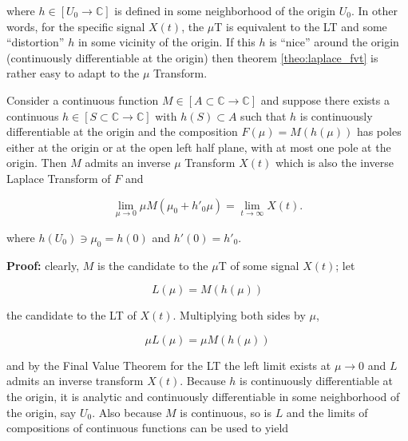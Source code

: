 	\noindent where $h\in\left[U_0\to\mathbb{C}\right]$ is defined in some neighborhood of the origin $U_0$. In other words, for the specific signal $X(t)$, the $\mu$T is equivalent to the LT and some ``distortion'' $h$ in some vicinity of the origin. If this $h$ is ``nice'' around the origin (continuously differentiable at the origin) then theorem \ref{theo:laplace_fvt} is rather easy to adapt to the $\mu$ Transform.

\begin{theorem}\label{theo:muT_fvt} %
	Consider a continuous function $M\in\left[A\subset\mathbb{C}\to\mathbb{C}\right]$ and suppose there exists a continuous $h\in\left[S\subset\mathbb{C}\to\mathbb{C}\right]$ with $h(S) \subset A$ such that $h$ is continuously differentiable at the origin and the composition $ F\left(\mu\right) = M\left(h\left(\mu\right)\right)$ has poles either at the origin or at the open left half plane, with at most one pole at the origin. Then $M$ admits an inverse $\mu$ Transform $X(t)$ which is also the inverse Laplace Transform of $F$ and 

\begin{equation} \lim\limits_{\mu\to 0} \mu M\left(\mu_0 + h'_0\mu\right) = \lim\limits_{t\to\infty} X(t). \label{eq:fvt_uT_4}\end{equation}

	\noindent where $h\left(U_0\right) \ni \mu_0 = h(0)$ and $h'(0) = h'_0$.
\end{theorem}
\textbf{Proof:} clearly, $M$ is the candidate to the $\mu$T of some signal $X(t)$; let

\begin{equation} L\left(\mu\right) = M\left(h\left(\mu\right)\right) \end{equation}

	\noindent the candidate to the LT of $X(t)$. Multiplying both sides by $\mu$,

\begin{equation} \mu L\left(\mu \right) = \mu M\left(h\left(\mu\right)\right) \label{eq:fvt_uT_def}\end{equation}

	\noindent and by the Final Value Theorem for the LT the left limit exists at $\mu\to 0$ and $L$ admits an inverse transform $X(t)$. Because $h$ is continuously differentiable at the origin, it is analytic and continuously differentiable in some neighborhood of the origin, say $U_0$. Also because $M$ is continuous, so is $L$ and the limits of compositions of continuous functions can be used to yield

